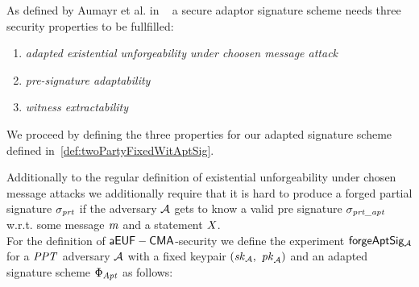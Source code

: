 As defined by Aumayr et al. in ~\cite{aumayr2020bitcoinchannels} a secure adaptor signature scheme needs three security properties to be fullfilled:
\begin{enumerate}
    \item \textit{adapted existential unforgeability under choosen message attack}
    \item \textit{pre-signature adaptability}
    \item \textit{witness extractability}
\end{enumerate}

We proceed by defining the three properties for our adapted signature scheme defined in~\ref{def:twoPartyFixedWitAptSig}.

\begin{definition}[$\cnstaEUFCMA$]\label{def:aeufcma}
        Additionally to the regular definition of existential unforgeability under chosen message attacks we additionally require that it is hard to produce a forged partial signature $\sigma_{\mathit{prt}}$ if the
    adversary $\mathcal{A}$ gets to know a valid pre signature $\sigma_{\mathit{prt\_apt}}$ w.r.t. some message $\mathit{m}$ and a statement $\mathit{X}$.\\
    For the definition of $\cnstaEUFCMA$-security we define the experiment $\mathsf{forgeAptSig_{\mathcal{A}}}$ for a $\mathit{PPT}$ adversary $\mathcal{A}$ with a fixed keypair $(\mathit{sk}_{\mathcal{A}} ,~ \mathit{pk}_{\mathcal{A}})$ and an adapted signature scheme $\Phi_{\mathit{Apt}}$ as
    follows:\\
    \fbox{
        \parbox{\textwidth}{
            \procedure[linenumbering, syntaxhighlight=auto]{$\procExpForg{\varN}$} {
                \varSet \opAssign \cnstEmptySet \\
                (\varNonceAdv \opSeperate \varRandAdv) \opFunResult \procSetupPartSig{\varSecParam} \\
                \varMsg \opFunResult \cnstAdversary^{\procSignOracle{\cdot}{\varSecKey}{\varPubKey}}(\varPubKeyAdv \opSeperate \varRandAdv) \\
                \varSigPartApt \opFunResult \procGenPtAptSig{\varMsg}{\varSecKey}{\varNonce}{\varPubKeyAdv}{\varRandAdv}{\varWit} \\
                \varSigPart \opFunResult \cnstAdversary^{\procSignOracle{\cdot}{\varSecKey}{\varPubKey}}(\varSigPartApt) \\
                \varSigFin \opFunResult \procFinAptSig{\varSigPart}{\varSigPartApt}{\varWit}{\varRand}{\varRandAdv} \\
                \pcreturn (\varMsg \opNotIn \varSet \opAnd \procVerf{\varMsg}{\varSigFin}{\varPubKeyAdv \opAddPoint \varPubKey})
}}}
\end{definition}
